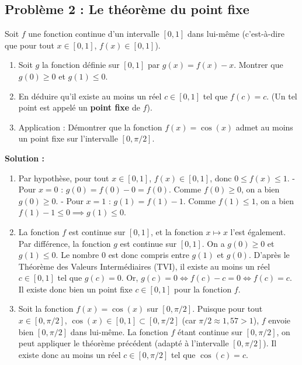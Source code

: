 \subsection*{Problème 2 : Le théorème du point fixe}
Soit $f$ une fonction continue d'un intervalle $[0, 1]$ dans lui-même (c'est-à-dire que pour tout $x \in [0, 1]$, $f(x) \in [0, 1]$).
\begin{enumerate}
    \item Soit $g$ la fonction définie sur $[0, 1]$ par $g(x) = f(x) - x$.
    Montrer que $g(0) \ge 0$ et $g(1) \le 0$.
    \item En déduire qu'il existe au moins un réel $c \in [0, 1]$ tel que $f(c) = c$. (Un tel point est appelé un \textbf{point fixe} de $f$).
    \item Application : Démontrer que la fonction $f(x) = \cos(x)$ admet au moins un point fixe sur l'intervalle $[0, \pi/2]$.
\end{enumerate}

\textbf{Solution :}
\begin{enumerate}
    \item Par hypothèse, pour tout $x \in [0, 1]$, $f(x) \in [0, 1]$, donc $0 \le f(x) \le 1$.
    - Pour $x = 0$ : $g(0) = f(0) - 0 = f(0)$. Comme $f(0) \ge 0$, on a bien $g(0) \ge 0$.
    - Pour $x = 1$ : $g(1) = f(1) - 1$. Comme $f(1) \le 1$, on a bien $f(1) - 1 \le 0 \implies g(1) \le 0$.
    
    \item La fonction $f$ est continue sur $[0, 1]$, et la fonction $x \mapsto x$ l'est également. Par différence, la fonction $g$ est continue sur $[0, 1]$.
    On a $g(0) \ge 0$ et $g(1) \le 0$. Le nombre 0 est donc compris entre $g(1)$ et $g(0)$.
    D'après le Théorème des Valeurs Intermédiaires (TVI), il existe au moins un réel $c \in [0, 1]$ tel que $g(c) = 0$.
    Or, $g(c) = 0 \iff f(c) - c = 0 \iff f(c) = c$.
    Il existe donc bien un point fixe $c \in [0, 1]$ pour la fonction $f$.
    
    \item Soit la fonction $f(x) = \cos(x)$ sur $[0, \pi/2]$.
    Puisque pour tout $x \in [0, \pi/2]$, $\cos(x) \in [0, 1] \subset [0, \pi/2]$ (car $\pi/2 \approx 1,57 > 1$), $f$ envoie bien $[0, \pi/2]$ dans lui-même.
    La fonction $f$ étant continue sur $[0, \pi/2]$, on peut appliquer le théorème précédent (adapté à l'intervalle $[0, \pi/2]$).
    Il existe donc au moins un réel $c \in [0, \pi/2]$ tel que $\cos(c) = c$.
\end{enumerate}

